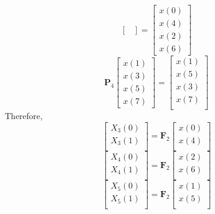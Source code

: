\documentclass[journal,12pt,twocolumn]{IEEEtran}
\let\vec\mathbf
\numberwithin{equation}{section}
\renewcommand\thesection{\arabic{section}}
\renewcommand\thesection{\arabic{section}}
\begin{document}
\begin{enumerate}[label=\arabic*.,ref=\thesection.\theenumi]
\begin{equation}
\begin{bmatrix}
\end{bmatrix}
 = 
\begin{bmatrix}
x(0) \\ 
x(4) \\ 
x(2) \\
x(6)
\end{bmatrix}
\end{equation}
\begin{equation}
\vec{P}_{4}
\begin{bmatrix}
x(1) \\ 
x(3) \\ 
x(5) \\
x(7)
\end{bmatrix}
 = 
\begin{bmatrix}
x(1) \\ 
x(5) \\ 
x(3) \\ 
x(7) \\
\end{bmatrix}
\end{equation}
Therefore,
\begin{equation}
\begin{bmatrix}
X_{3}(0) \\ 
X_{3}(1)\\ 
\end{bmatrix}
= \vec{F}_{2}
\begin{bmatrix}
x(0) \\ 
x(4) \\ 
\end{bmatrix}
\end{equation}
\begin{equation}
\begin{bmatrix}
X_{4}(0) \\ 
X_{4}(1)\\ 
\end{bmatrix}
= \vec{F}_{2}
\begin{bmatrix}
x(2) \\ 
x(6) \\ 
\end{bmatrix}
\end{equation}
\begin{equation}
\begin{bmatrix}
X_{5}(0) \\ 
X_{5}(1)\\ 
\end{bmatrix}
= \vec{F}_{2}
\begin{bmatrix}
x(1) \\ 
x(5) \\ 

\end{bmatrix}
\end{equation}
\end{enumerate}
\end{document}
